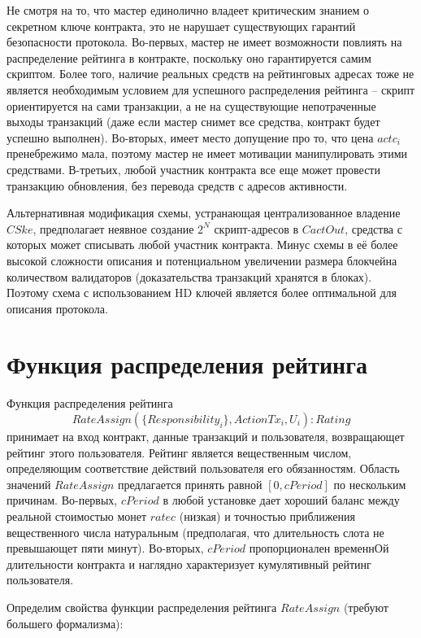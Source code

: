 \documentclass[specification,annotation]{itmo-student-thesis}
\begin{document}
Не смотря на то, что мастер единолично владеет критическим знанием о
секретном ключе контракта, это не нарушает существующих гарантий
безопасности протокола. Во-первых, мастер не имеет возможности
повлиять на распределение рейтинга в контракте, поскольку оно
гарантируется самим скриптом. Более того, наличие реальных средств на
рейтинговых адресах тоже не является необходимым условием для
успешного распределения рейтинга -- скрипт ориентируется на сами
транзакции, а не на существующие непотраченные выходы транзакций (даже
если мастер снимет все средства, контракт будет успешно
выполнен). Во-вторых, имеет место допущение про то, что цена $actc_i$
пренебрежимо мала, поэтому мастер не имеет мотивации манипулировать
этими средствами. В-третьих, любой участник контракта все еще может
провести транзакцию обновления, без перевода средств с адресов
активности.

Альтернативная модификация схемы, устранающая централизованное
владение $CSke$, предполагает неявное создание $2^N$ скрипт-адресов в
$CactOut$, средства с которых может списывать любой участник
контракта. Минус схемы в её более высокой сложности описания и
потенциальном увеличении размера блокчейна количеством валидаторов
(доказательства транзакций хранятся в блоках). Поэтому схема с
использованием HD ключей является более оптимальной для описания
протокола.

\section{Функция распределения рейтинга}

Функция распределения рейтинга
\[RateAssign(\{Responsibility_i\},{ActionTx_i}, U_i) : Rating\]
принимает на вход контракт, данные транзакций и пользователя,
возвращающет рейтинг этого пользователя. Рейтинг является вещественным
числом, определяющим соответствие действий пользователя его
обязанностям. Область значений $RateAssign$ предлагается принять
равной $[0,cPeriod]$ по нескольким причинам. Во-первых, $cPeriod$ в
любой установке дает хороший баланс между реальной стоимостью монет
$ratec$ (низкая) и точностью приближения вещественного числа
натуральным (предполагая, что длительность слота не превышающет пяти
минут). Во-вторых, $cPeriod$ пропорционален временнОй длительности
контракта и наглядно характеризует кумулятивный рейтинг пользователя.

Определим свойства функции распределения рейтинга $RateAssign$
(требуют большего формализма):
\end{document}
